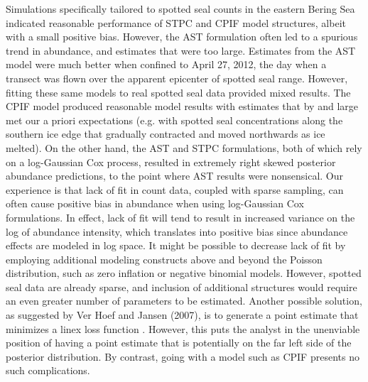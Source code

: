 \documentclass[times,mee,doublespace,]{besauth2}
\begin{document}
Simulations specifically tailored to spotted seal counts in the eastern Bering Sea indicated reasonable performance of STPC and CPIF model structures, albeit with a small positive bias.  However, the AST formulation often led to a spurious trend in abundance, and estimates that were too large.  Estimates from the AST model were much better when confined to April 27, 2012, the day when a transect was flown over the apparent epicenter of spotted seal range.  However, fitting these same models to real spotted seal data provided mixed results.  The CPIF model produced reasonable model results with estimates that by and large met our a priori expectations (e.g. with spotted seal concentrations along the southern ice edge that gradually contracted and moved northwards as ice melted).  On the other hand, the AST and STPC formulations, both of which rely on a log-Gaussian Cox process, resulted in extremely right skewed posterior abundance predictions, to the point where AST results were nonsensical.  Our experience \citep[see e.g.][]{VerHoefJansen2007,ConnEtAl2014} is that lack of fit in count data, coupled with sparse sampling, can often cause positive bias in abundance when using log-Gaussian Cox formulations.  In effect, lack of fit will tend to result in increased variance on the log of abundance intensity, which translates into positive bias since abundance effects are modeled in log space.  It might be possible to decrease lack of fit by employing additional modeling constructs above and beyond the Poisson distribution, such as zero inflation \citep{AgarwalEtAl2002,VerHoefJansen2007} or negative binomial models.  However, spotted seal data are already sparse, and inclusion of additional structures would require an even greater number of parameters to be estimated. Another possible solution, as suggested by Ver Hoef and Jansen (2007), is to generate a point estimate that minimizes a linex loss function \citep{Varian1975}.  However, this puts the analyst in the unenviable position of having a point estimate that is potentially on the far left side of the posterior distribution.  By contrast, going with a model such as CPIF presents no such complications.
\end{document}
